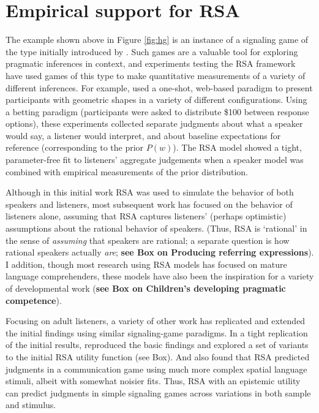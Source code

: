 \documentclass[]{elsarticle}
\begin{document}
\section{Empirical support for RSA}\label{empirical-support-for-rsa}

The example shown above in Figure \ref{fig:hg} is an instance of a signaling game of the type  initially introduced by \citet{lewis1969}. Such games are a valuable tool for exploring pragmatic inferences in context, and experiments testing the
RSA framework have used games of this type to make quantitative
measurements of a variety of different inferences. For example, \citet{frank2012} used a one-shot, web-based paradigm to present
participants with geometric shapes in a variety of different
configurations. Using a betting paradigm (participants were asked to
distribute \$100 between response options), these experiments collected
separate judgments about what a speaker would say, a listener would
interpret, and about baseline expectations for reference (corresponding
to the prior $P(w)$). The RSA model showed a tight, parameter-free fit
to listeners' aggregate judgements when a speaker model was combined
with empirical measurements of the prior distribution.

Although in this initial work RSA was used to simulate the behavior of
both speakers and listeners, most subsequent work has focused on the
behavior of listeners alone, assuming that RSA captures listeners'
(perhaps optimistic) assumptions about the rational behavior of
speakers. (Thus, RSA is `rational' in the sense of \emph{assuming} that
speakers are rational; a separate question is how rational speakers
actually \emph{are}; \textbf{see Box on Producing referring expressions}). I addition, though most research using RSA models has focused on mature language comprehenders, these models have also been the inspiration for a variety of developmental work (\textbf{see Box on Children's developing pragmatic competence}).

Focusing on adult listeners, a variety of other work has replicated and extended the initial findings
using similar signaling-game paradigms. In a tight replication of the
initial results, \citet{qing2015} reproduced the basic findings and
explored a set of variants to the initial RSA utility function (see
Box). And \citet{carstensen2014} also found that RSA
predicted judgments in a communication game using much more complex
spatial language stimuli, albeit with somewhat noisier fits. Thus, RSA
with an epistemic utility can predict judgments in simple signaling
games across variations in both sample and stimulus.
\end{document}
